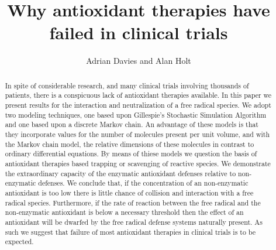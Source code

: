 \documentclass[preprint,12pt,authoryear]{elsarticle}
\begin{document}
 

\newcommand{\inquotes}[1] { ``{#1}''}

\begin{frontmatter}





\title{Why antioxidant therapies have failed in clinical trials}



\author{Adrian Davies and Alan Holt}

\address{}

\begin{abstract}

In spite of considerable research, and many clinical trials involving thousands of patients, there is a conspicuous lack of antioxidant therapies available. In this paper we present results for the interaction and neutralization of a free radical species. We adopt two modeling techniques, one based upon Gillespie’s Stochastic Simulation Algorithm and one based upon a discrete Markov chain. An advantage of these models is that they incorporate values for the number of molecules present per unit volume, and with the Markov chain model, the relative dimensions of these molecules in contrast to ordinary differential equations. By means of thiese models we question the basis of antioxidant therapies based trapping or scavenging of reactive species. We demonstrate the extraordinary capacity of the enzymatic antioxidant defenses relative to non-enzymatic defenses. We conclude that, if the concentration of an non-enzymatic antioxidant is too low there is little chance of collision and interaction with a free radical species. Furthermore, if the rate of reaction between the free radical and the non-enzymatic antioxidant is below a necessary threshold then the effect of an antioxidant will be dwarfed by the free radical defense systems naturally present. As such we suggest that failure of most antioxidant therapies in clinical trials is to be expected.


\end{abstract}
\end{frontmatter}
\end{document}
